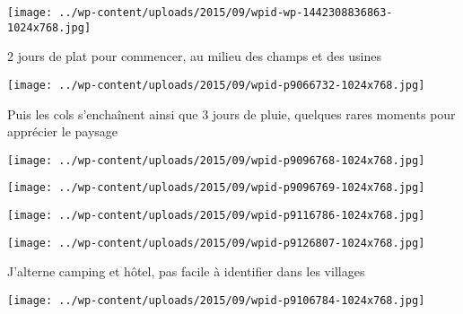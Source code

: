  

 

\begin{center} \texttt{[image: ../wp-content/uploads/2015/09/wpid-wp-1442308836863-1024x768.jpg]} \end{center}

 

 2 jours de plat pour commencer, au milieu des champs et des usines 

 

\begin{center} \texttt{[image: ../wp-content/uploads/2015/09/wpid-p9066732-1024x768.jpg]} \end{center}

 

 Puis les cols s'enchaînent ainsi que 3 jours de pluie, quelques rares moments pour apprécier le paysage 

 

\begin{center} \texttt{[image: ../wp-content/uploads/2015/09/wpid-p9096768-1024x768.jpg]} \end{center}

 

 

\begin{center} \texttt{[image: ../wp-content/uploads/2015/09/wpid-p9096769-1024x768.jpg]} \end{center}

 

 

\begin{center} \texttt{[image: ../wp-content/uploads/2015/09/wpid-p9116786-1024x768.jpg]} \end{center}

 

 

\begin{center} \texttt{[image: ../wp-content/uploads/2015/09/wpid-p9126807-1024x768.jpg]} \end{center}

 

 J'alterne camping et hôtel, pas facile à identifier dans les villages 

 

\begin{center} \texttt{[image: ../wp-content/uploads/2015/09/wpid-p9106784-1024x768.jpg]} \end{center}

